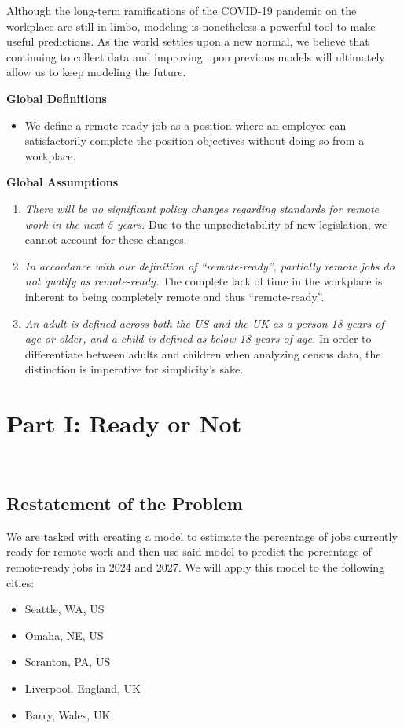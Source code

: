 \documentclass{article}
\begin{document}
\indent
	Although the long-term ramifications of the COVID-19 pandemic on the workplace are still in limbo, modeling is nonetheless a powerful tool to make useful predictions. As the world settles upon a new normal, we believe that continuing to collect data and improving upon previous models will ultimately allow us to keep modeling the future.



\newpage
\tableofcontents
\newpage

\noindent
\textbf{\large Global Definitions}
\begin{itemize}
    \item We define a remote-ready job as a position where an employee can satisfactorily complete the position objectives without doing so from a workplace.
\end{itemize}
\noindent
\textbf{\large Global Assumptions}
\begin{enumerate}
    \item \textit{There will be no significant policy changes regarding standards for remote work in the next 5 years.} Due to the unpredictability of new legislation, we cannot account for these changes.
    \item \textit{In accordance with our definition of “remote-ready”, partially remote jobs do not qualify as remote-ready.} The complete lack of time in the workplace is inherent to being completely remote and thus “remote-ready”.
    \item \textit{An adult is defined across both the US and the UK as a person 18 years of age or older, and a child is defined as below 18 years of age.} In order to differentiate between adults and children when analyzing census data, the distinction is imperative for simplicity’s sake.
\end{enumerate}

\section{Part I: Ready or Not}
\

\subsection{Restatement of the Problem}
We are tasked with creating a model to estimate the percentage of jobs currently ready for remote work and then use said model to predict the percentage of remote-ready jobs in 2024 and 2027. We will apply this model to the following cities:
\begin{itemize}
    \item Seattle, WA, US
    \item Omaha, NE, US
    \item Scranton, PA, US
    \item Liverpool, England, UK
    \item Barry, Wales, UK
\end{itemize}
\end{document}
